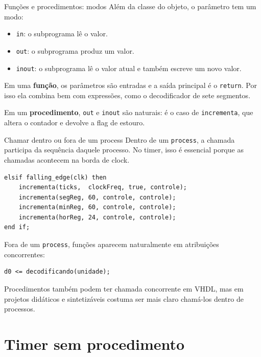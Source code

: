 \documentclass[aspectratio=169,11pt]{beamer}
\begin{document}
\begin{frame}{Funções e procedimentos: modos}
    Além da classe do objeto, o parâmetro tem um modo:

    \begin{itemize}
        \item \texttt{in}: o subprograma lê o valor.
        \item \texttt{out}: o subprograma produz um valor.
        \item \texttt{inout}: o subprograma lê o valor atual e também escreve um novo valor.
    \end{itemize}

    \vspace{0.5em}
    Em uma \textbf{função}, os parâmetros são entradas e a saída principal é o \texttt{return}. Por isso ela combina bem com expressões, como o decodificador de sete segmentos.

    \vspace{0.5em}
    Em um \textbf{procedimento}, \texttt{out} e \texttt{inout} são naturais: é o caso de \texttt{incrementa}, que altera o contador e devolve a flag de estouro.
\end{frame}

\begin{frame}[fragile]{Chamar dentro ou fora de um process}
    Dentro de um \texttt{process}, a chamada participa da sequência daquele processo. No timer, isso é essencial porque as chamadas acontecem na borda de clock.

\begin{lstlisting}
elsif falling_edge(clk) then
    incrementa(ticks,  clockFreq, true, controle);
    incrementa(segReg, 60, controle, controle);
    incrementa(minReg, 60, controle, controle);
    incrementa(horReg, 24, controle, controle);
end if;
\end{lstlisting}

    Fora de um \texttt{process}, funções aparecem naturalmente em atribuições concorrentes:

\begin{lstlisting}
d0 <= decodificando(unidade);
\end{lstlisting}

    \vspace{0.2em}
    Procedimentos também podem ter chamada concorrente em VHDL, mas em projetos didáticos e sintetizáveis costuma ser mais claro chamá-los dentro de processos.
\end{frame}

\section{Timer sem procedimento}
\end{document}
